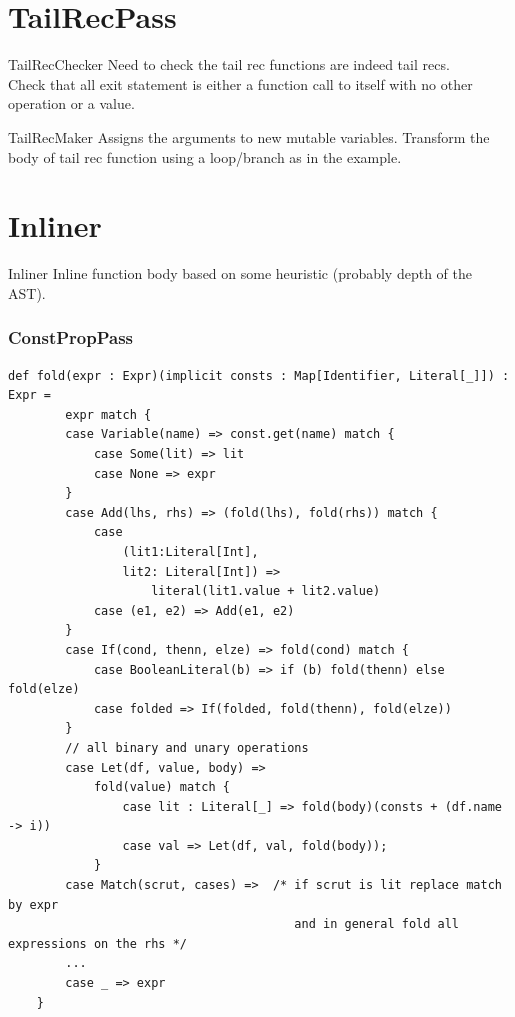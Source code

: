 \documentclass{beamer}
\begin{document}
\section{TailRecPass}
\begin{frame}{TailRecChecker}
    Need to check the tail rec functions are indeed tail recs.\\
    Check that all exit statement is either a function call to itself with no other operation or a value.
\end{frame}

\begin{frame}{TailRecMaker}
    Assigns the arguments to new mutable variables.
    Transform the body of tail rec function using a loop/branch as in the example.
\end{frame}

\section{Inliner}
\begin{frame}{Inliner}
    Inline function body based on some heuristic (probably depth of the AST). 
\end{frame}

\begin{frame}[fragile]
\frametitle{ConstPropPass}
\begin{lstlisting}[basicstyle=\tiny\ttfamily]
    def fold(expr : Expr)(implicit consts : Map[Identifier, Literal[_]]) : Expr = 
        expr match {
        case Variable(name) => const.get(name) match {
            case Some(lit) => lit
            case None => expr
        }
        case Add(lhs, rhs) => (fold(lhs), fold(rhs)) match {
            case 
                (lit1:Literal[Int], 
                lit2: Literal[Int]) => 
                    literal(lit1.value + lit2.value)
            case (e1, e2) => Add(e1, e2)
        }
        case If(cond, thenn, elze) => fold(cond) match {
            case BooleanLiteral(b) => if (b) fold(thenn) else fold(elze)
            case folded => If(folded, fold(thenn), fold(elze))
        }
        // all binary and unary operations
        case Let(df, value, body) => 
            fold(value) match {
                case lit : Literal[_] => fold(body)(consts + (df.name -> i))
                case val => Let(df, val, fold(body));
            }
        case Match(scrut, cases) =>  /* if scrut is lit replace match by expr
                                        and in general fold all expressions on the rhs */
        ...
        case _ => expr
    }
\end{lstlisting}
\end{frame}
\end{document}
